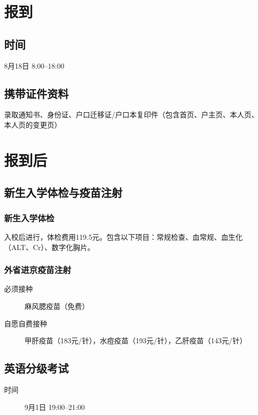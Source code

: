 \documentclass[a4paper]{ctexart}
\begin{document}
\section{报到}

\subsection{时间}
8月18日 8:00--18:00

\subsection{携带证件资料}
\label{携带证件资料}


录取通知书、身份证、户口迁移证/户口本复印件（包含首页、户主页、本人页、本人页的变更页）

\section{报到后}
\subsection{新生入学体检与疫苗注射}

\subsubsection{新生入学体检}
入校后进行，体检费用119.5元。包含以下项目：常规检查、血常规、血生化（ALT、Cr）、数字化胸片。

\subsubsection{外省进京疫苗注射}

\begin{description}
	\item[必须接种] 麻风腮疫苗（免费）
	\item[自愿自费接种] 甲肝疫苗（183元/针），水痘疫苗（193元/针），乙肝疫苗（143元/针）
\end{description}

\subsection{英语分级考试}

\begin{description}
	\item[时间] 9月1日 19:00--21:00
\end{description}
\end{document}
